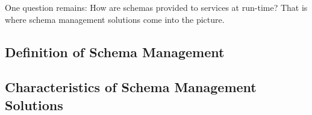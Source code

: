 One question remains: How are schemas provided to services at run-time?
That is where schema management solutions come into the picture.








\subsection{Definition of Schema Management}

\subsection{Characteristics of Schema Management Solutions}
